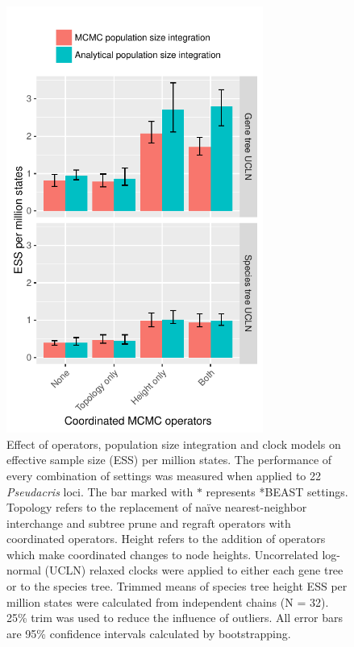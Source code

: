 \documentclass[12pt]{article}
\begin{document}
\begin{figure}[htb!]
\centering
\includegraphics[height=14cm]{speciesTreeHeight_ess_per_mstates.pdf}
\caption
{Effect of operators, population size integration and clock models on effective
sample size (ESS) per million states. The performance of every combination of
settings was measured when applied to 22 \textit{Pseudacris} loci. The bar marked with $\ast$ represents *BEAST
settings. Topology refers to the
replacement of na\"ive nearest-neighbor interchange and subtree prune and regraft operators with coordinated operators. Height
refers to the addition of operators which make coordinated changes to
node heights. Uncorrelated log-normal (UCLN) relaxed clocks were applied
to either each gene tree or to the species tree. Trimmed means
of species tree height ESS per million states were calculated from
independent chains (N = 32). 25\% trim was used to reduce the influence
of outliers. All error bars are 95\% confidence intervals calculated by
bootstrapping.}
\label{fig:realEssPerMstates}
\end{figure}
\end{document}
